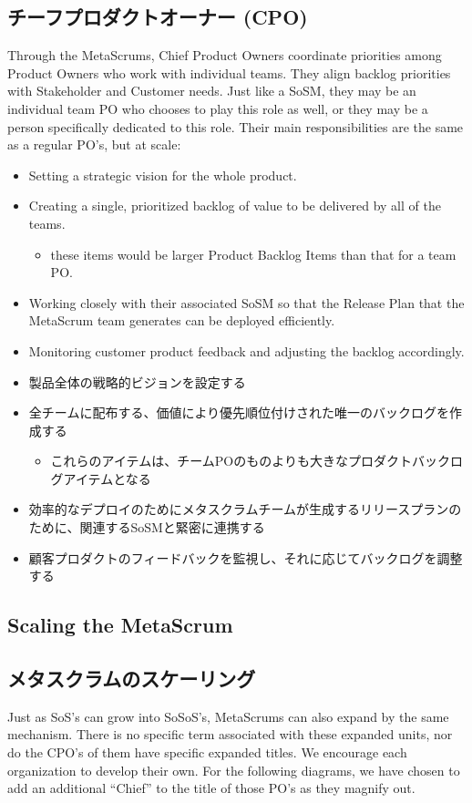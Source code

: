 \documentclass[12pt,a4paper,parskip=full]{scrartcl}
\begin{document}
\subsection{チーフプロダクトオーナー (CPO)}
Through the MetaScrums, Chief Product Owners coordinate priorities among
Product Owners who work with individual teams. They align backlog
priorities with Stakeholder and Customer needs. Just like a SoSM, they may
be an individual team PO who chooses to play this role as well, or they may
be a person specifically dedicated to this role. Their main
responsibilities are the same as a regular PO's, but at scale:
\begin{itemize}
\item Setting a strategic vision for the whole product.
\item Creating a single, prioritized backlog of value to be delivered by
all of the teams.
\begin{itemize}
\item these items would be larger Product Backlog Items than that for a team PO.
\end{itemize}
\item Working closely with their associated SoSM so that the Release Plan
that the MetaScrum team generates can be deployed efficiently.
\item Monitoring customer product feedback and adjusting the backlog
accordingly.
\end{itemize}
\fi
\begin{itemize}
\item 製品全体の戦略的ビジョンを設定する
\item 全チームに配布する、価値により優先順位付けされた唯一のバックログを作成する
\begin{itemize}
\item これらのアイテムは、チームPOのものよりも大きなプロダクトバックログアイテムとなる
\end{itemize}
\item 効率的なデプロイのためにメタスクラムチームが生成するリリースプランのために、関連するSoSMと緊密に連携する
\item 顧客プロダクトのフィードバックを監視し、それに応じてバックログを調整する
\end{itemize}

\subsection{Scaling the MetaScrum}
\fi
\subsection{メタスクラムのスケーリング}
Just as SoS's can grow into SoSoS's, MetaScrums can also expand by the same
mechanism. There is no specific term associated with these expanded units,
nor do the CPO's of them have specific expanded titles. We encourage each
organization to develop their own. For the following diagrams, we have
chosen to add an additional ``Chief'' to the title of those PO's as they
magnify out.
\end{document}

